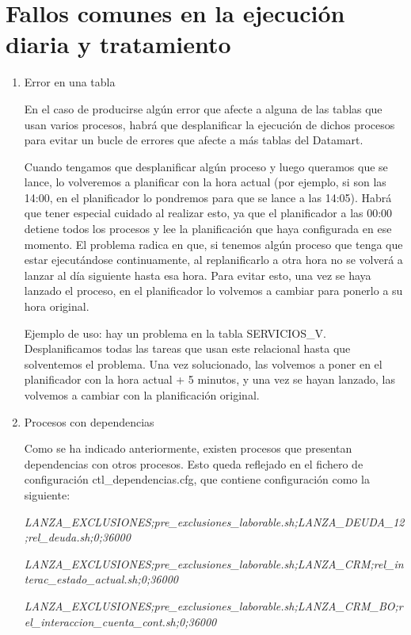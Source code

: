 \documentclass[a4paper, 12pt]{book}
\begin{document}
\section{Fallos comunes en la ejecución diaria y tratamiento} 
\label{sec:fallos}

\begin{enumerate}
	\item Error en una tabla \par
En el caso de producirse algún error que afecte a alguna de las tablas que usan varios procesos, habrá que desplanificar la ejecución de dichos procesos para evitar un bucle de errores que afecte a más tablas del Datamart. 

Cuando tengamos que desplanificar algún proceso y luego queramos que se lance, lo volveremos a planificar con la hora actual (por ejemplo, si son las 14:00, en el planificador lo pondremos para que se lance a las 14:05). Habrá que tener especial cuidado al realizar esto, ya que el planificador a las 00:00 detiene todos los procesos y lee la planificación que haya configurada en ese momento. El problema radica en que, si tenemos algún proceso que tenga que estar ejecutándose continuamente, al replanificarlo a otra hora no se volverá a lanzar al día siguiente hasta esa hora. Para evitar esto, una vez se haya lanzado el proceso, en el planificador lo volvemos a cambiar para ponerlo a su hora original.

Ejemplo de uso: hay un problema en la tabla SERVICIOS\_V. Desplanificamos todas las tareas que usan este relacional hasta que solventemos el problema. Una vez solucionado, las volvemos a poner en el planificador con la hora actual + 5 minutos, y una vez se hayan lanzado, las volvemos a cambiar con la planificación original.

	\item Procesos con dependencias \par
	Como se ha indicado anteriormente, existen procesos que presentan dependencias con otros procesos. Esto queda reflejado en el fichero de configuración ctl\_dependencias.cfg, que contiene configuración como la siguiente:
	
\textit{LANZA\_EXCLUSIONES;pre\_exclusiones\_laborable.sh;LANZA\_DEUDA\_12;rel\_deuda.sh;0;36000}

\textit{LANZA\_EXCLUSIONES;pre\_exclusiones\_laborable.sh;LANZA\_CRM;rel\_interac\_estado\_actual.sh;0;36000}

\textit{LANZA\_EXCLUSIONES;pre\_exclusiones\_laborable.sh;LANZA\_CRM\_BO;rel\_interaccion\_cuenta\_cont.sh;0;36000}


\end{enumerate}
\end{document}
